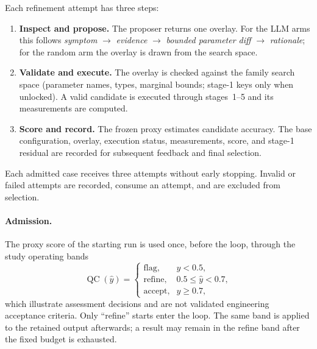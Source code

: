 \documentclass[a4paper,fleqn]{cas-dc}
\begin{document}
Each refinement attempt has three steps:
\begin{enumerate}
\item \textbf{Inspect and propose.}
The proposer returns one overlay. For the LLM arms this follows \emph{symptom} $\rightarrow$ \emph{evidence} $\rightarrow$ \emph{bounded parameter diff} $\rightarrow$ \emph{rationale}; for the random arm the overlay is drawn from the search space.
\item \textbf{Validate and execute.}
The overlay is checked against the family search space (parameter names, types, marginal bounds; stage-1 keys only when unlocked). A valid candidate is executed through stages~1--5 and its measurements are computed.
\item \textbf{Score and record.}
The frozen proxy estimates candidate accuracy. The base configuration, overlay, execution status, measurements, score, and stage-1 residual are recorded for subsequent feedback and final selection.
\end{enumerate}
Each admitted case receives three attempts without early stopping. Invalid or failed attempts are recorded, consume an attempt, and are excluded from selection.

\paragraph{Admission.}
The proxy score of the starting run is used once, before the loop, through the study operating bands
\begin{equation}
\operatorname{QC}(\hat y)=
\begin{cases}
\text{flag}, & \hat y<0.5,\\
\text{refine}, & 0.5\le\hat y<0.7,\\
\text{accept}, & \hat y\ge0.7,
\end{cases}
\label{eq:qc-bands}
\end{equation}
which illustrate assessment decisions and are not validated engineering acceptance criteria. Only ``refine'' starts enter the loop. The same band is applied to the retained output afterwards; a result may remain in the refine band after the fixed budget is exhausted.
\end{document}
